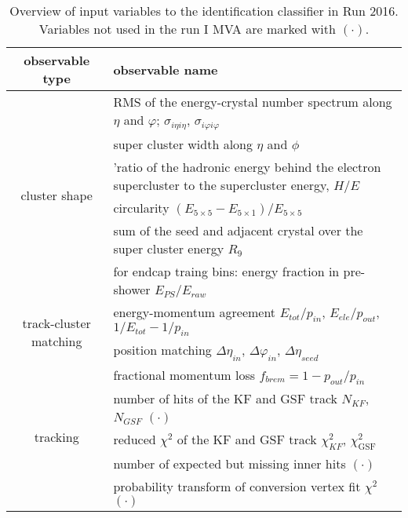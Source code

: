 \begin{table}[h!]
\scriptsize
    \centering
    \begin{tabular}{c|l}
\hline %
\hline %
observable type    &  observable name      	\\
\hline %

\multirow{6}{*}{cluster shape}
	&  RMS of the energy-crystal number spectrum along $\eta$ and $\varphi$; $\sigma_{i\eta i\eta}$, $\sigma_{i\varphi i\varphi}$		\\
	&  super cluster width along $\eta$ and $\phi$		\\
	&  'ratio of the hadronic energy behind the electron 
supercluster to the supercluster energy, $H/E$			\\
	&  circularity $(E_{5\times5} - E_{5\times1})/E_{5\times5}$			\\
	&  sum of the seed and adjacent crystal over the super cluster energy $R_{9}$			\\
	&  for endcap traing bins: energy fraction in pre-shower $E_{PS}/E_{raw}$			\\
\hline
\multirow{2}{*}{track-cluster matching}
	& energy-momentum agreement $E_{tot}/p_{in}$, $E_{ele}/p_{out}$, $1/E_{tot} - 1/p_{in}$ 			\\
	& position matching $\Delta\eta_{in}$, $\Delta\varphi_{in}$, $\Delta\eta_{seed}$			\\
\hline
\multirow{5}{*}{tracking}
        & fractional momentum loss $f_{brem} = 1 - p_{out}/p_{in}$	\\
        & number of hits of the KF and GSF track $N_{KF}$, $N_{GSF}$ $(\mathord{\cdot})$ \\
        & reduced $\chi^2$ of the KF and GSF track $\chi^{2}_{KF}$, $\chi^{2}_{\textrm{GSF}}$ \\
        & number of expected but missing inner hits $(\mathord{\cdot})$ 	\\
        & probability transform of conversion vertex fit $\chi^2$ $(\mathord{\cdot})$ \\

\hline %
\hline %
     \end{tabular}
\small
    \caption{Overview of input variables to the identification classifier in Run 2016. Variables not used in the run I MVA are marked with  $(\mathord{\cdot})$.}
    \label{tab:ele_ID_input_variables_16}
\end{table}


